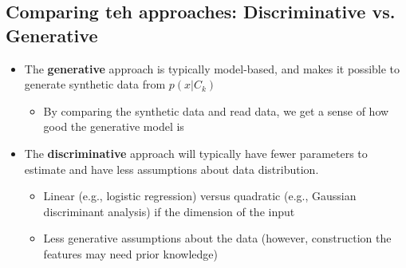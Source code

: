 \subsection{Comparing teh approaches: Discriminative vs. Generative}
\begin{itemize}
	\item The \textbf{generative} approach is typically model-based, and makes it possible to generate synthetic data from $p(x|C_k)$
	\begin{itemize}
		\item By comparing the synthetic data and read data, we get a sense of how good the generative model is
	\end{itemize}
	\item The \textbf{discriminative} approach will typically have fewer parameters to estimate and have less assumptions about data distribution.
	\begin{itemize}
		\item Linear (e.g., logistic regression) versus quadratic (e.g., Gaussian discriminant analysis) if the dimension of the input
		\item Less generative assumptions about the data (however, construction the features may need prior knowledge)
	\end{itemize}
\end{itemize}

